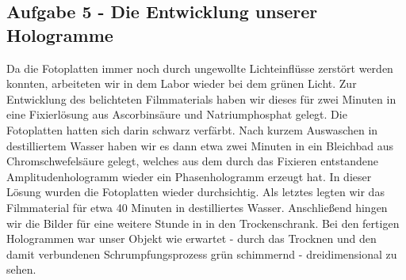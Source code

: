 \subsection*{Aufgabe 5 - Die Entwicklung unserer Hologramme}
Da die Fotoplatten immer noch durch ungewollte Lichteinflüsse zerstört werden konnten, arbeiteten wir in dem Labor wieder bei dem grünen Licht. Zur Entwicklung des belichteten Filmmaterials haben wir dieses für zwei Minuten in eine Fixierlösung aus Ascorbinsäure und Natriumphosphat gelegt. Die Fotoplatten hatten sich darin schwarz verfärbt.
Nach kurzem Auswaschen in destilliertem Wasser haben wir es dann etwa zwei Minuten in ein Bleichbad aus Chromschwefelsäure gelegt, welches aus dem durch das Fixieren entstandene Amplitudenhologramm wieder ein Phasenhologramm erzeugt hat. In dieser Lösung wurden die Fotoplatten wieder durchsichtig. Als letztes legten wir das Filmmaterial für etwa 40 Minuten in destilliertes Wasser. Anschließend hingen wir die Bilder für eine weitere Stunde in in den Trockenschrank. Bei den fertigen Hologrammen war unser Objekt wie erwartet - durch das Trocknen und den damit verbundenen Schrumpfungsprozess grün schimmernd - dreidimensional zu sehen.